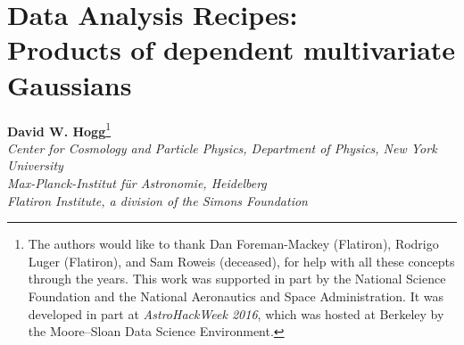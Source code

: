 \newcommand{\va}{\vector{a}}
\newcommand{\vb}{\vector{b}}
\newcommand{\vm}{\vector{m}}
\newcommand{\vx}{\vector{x}}
\newcommand{\vy}{\vector{y}}
\newcommand{\vz}{\vector{z}}
\newcommand{\vmu}{\vector{\mu}}
\newcommand{\veta}{\vector{\eta}}
\newcommand{\vtheta}{\vector{\theta}}
\newcommand{\tA}{\tensor{A}}
\newcommand{\tB}{\tensor{B}}
\newcommand{\tC}{\tensor{C}}
\newcommand{\tD}{\tensor{D}}
\newcommand{\tI}{\tensor{I}}
\newcommand{\tQ}{\tensor{Q}}
\newcommand{\tS}{\tensor{S}}
\newcommand{\tH}{\tensor{H}}
\newcommand{\tV}{\tensor{V}}
\newcommand{\tLambda}{\tensor{\Lambda}}
\newcommand{\mM}{\matrix{M}}
\newcommand{\mN}{\matrix{N}}
\newcommand{\mU}{\matrix{U}}
\newcommand{\mV}{\matrix{V}}
\newcommand{\bP}{\ensuremath{\textrm{\ding{80}}}} %
\newcommand{\bH}{\ensuremath{\textrm{\ding{114}}}} %

\newcommand{\apj}{ApJ} %
\newcommand{\apjs}{ApJS} %

\addtolength{\topmargin}{-0.75in}
\addtolength{\textheight}{1.5in}
\setlength{\parindent}{\baselineskip}
\raggedbottom\sloppy\sloppypar\frenchspacing

\usepackage{color}
\newcommand{\todo}[2]{\textcolor{BrickRed}{[#1 TODO: #2]}}
\newcommand{\apw}[1]{\textcolor{CadetBlue}{[APW says: #1]}}
\newcommand{\bl}[1]{\textcolor{red}{[BL says: #1]}}
\newcommand{\hogg}[1]{\textcolor{magenta}{[Hogg says: #1]}}



\section*{Data Analysis Recipes:\\ Products of dependent multivariate Gaussians}

\noindent\textbf{David W. Hogg}\footnote{%
The authors would like to thank
  Dan Foreman-Mackey (Flatiron),
  Rodrigo Luger (Flatiron), and
  Sam Roweis (deceased),
for help with all these concepts through the years.
This work was supported in part by the National Science Foundation
and the National Aeronautics and Space Administration. It was developed
in part at \textsl{AstroHackWeek 2016}, which was hosted at Berkeley
by the Moore--Sloan Data Science Environment.
}\\
{\footnotesize%
  \textsl{Center for Cosmology and Particle Physics, Department of Physics, New York University}\\
  \textsl{Max-Planck-Institut f\"ur Astronomie, Heidelberg}\\
  \textsl{Flatiron Institute, a division of the Simons Foundation}%
}

